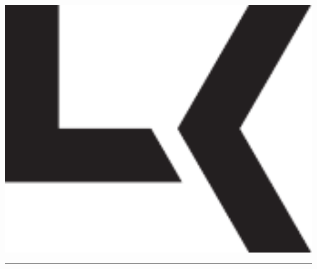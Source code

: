 \documentclass[a4paper, final, 12pt, oneside]{scrartcl}
\numberwithin{equation}{section}
\numberwithin{table}{section}
\numberwithin{figure}{section}
\begin{document}
\setlength{\parindent}{0pt}

\thispagestyle{empty}

\begin{minipage}{\textwidth}
  \begin{minipage}[h]{0.11\textwidth}
      \includegraphics[width=1\textwidth]{../general/logo_black.pdf}
  \end{minipage}
  \hfill
  \begin{minipage}[h]{0.7\textwidth}
      {\huge \textbf{\textsf{\productName}}} \hfill
      {\huge \textbf{\textsf{\productNumber}}}
  \end{minipage}
\end{minipage} 

\vspace*{5pt}
\rule{\textwidth}{0.4pt}
\end{document}
